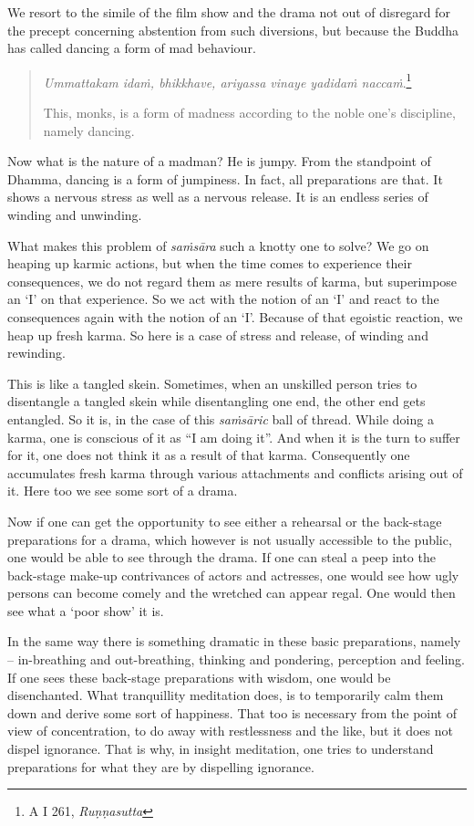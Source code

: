 We resort to the simile of the film show and the drama not out of disregard for the precept concerning abstention from such diversions, but because the Buddha has called dancing a form of mad behaviour.

\begin{quote}
\emph{Ummattakam idaṁ, bhikkhave, ariyassa vinaye yadidaṁ naccaṁ}.\footnote{A I 261, \emph{Ruṇṇasutta}}

This, monks, is a form of madness according to the noble one's discipline, namely dancing.
\end{quote}

Now what is the nature of a madman? He is jumpy. From the standpoint of Dhamma, dancing is a form of jumpiness. In fact, all preparations are that. It shows a nervous stress as well as a nervous release. It is an endless series of winding and unwinding.

What makes this problem of \emph{saṁsāra} such a knotty one to solve? We go on heaping up karmic actions, but when the time comes to experience their consequences, we do not regard them as mere results of karma, but superimpose an `I' on that experience. So we act with the notion of an `I' and react to the consequences again with the notion of an `I'. Because of that egoistic reaction, we heap up fresh karma. So here is a case of stress and release, of winding and rewinding.

This is like a tangled skein. Sometimes, when an unskilled person tries to disentangle a tangled skein while disentangling one end, the other end gets entangled. So it is, in the case of this \emph{saṁsāric} ball of thread. While doing a karma, one is conscious of it as ``I am doing it''. And when it is the turn to suffer for it, one does not think it as a result of that karma. Consequently one accumulates fresh karma through various attachments and conflicts arising out of it. Here too we see some sort of a drama.

Now if one can get the opportunity to see either a rehearsal or the back-stage preparations for a drama, which however is not usually accessible to the public, one would be able to see through the drama. If one can steal a peep into the back-stage make-up contrivances of actors and actresses, one would see how ugly persons can become comely and the wretched can appear regal. One would then see what a `poor show' it is.

In the same way there is something dramatic in these basic preparations, namely -- in-breathing and out-breathing, thinking and pondering, perception and feeling. If one sees these back-stage preparations with wisdom, one would be disenchanted. What tranquillity meditation does, is to temporarily calm them down and derive some sort of happiness. That too is necessary from the point of view of concentration, to do away with restlessness and the like, but it does not dispel ignorance. That is why, in insight meditation, one tries to understand preparations for what they are by dispelling ignorance.

